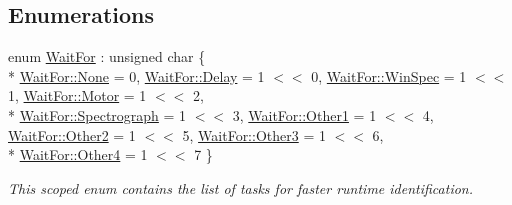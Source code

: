 \subsection*{Enumerations}
\begin{DoxyCompactItemize}
\item 
enum \hyperlink{namespace_wait_task_list_traits_a3cb74ee1929f03e51486087ef21caf9f}{Wait\+For} \+: unsigned char \{ \\*
\hyperlink{namespace_wait_task_list_traits_a3cb74ee1929f03e51486087ef21caf9fa6adf97f83acf6453d4a6a4b1070f3754}{Wait\+For\+::\+None} = 0, 
\hyperlink{namespace_wait_task_list_traits_a3cb74ee1929f03e51486087ef21caf9fa8f497c1a3d15af9e0c215019f26b887d}{Wait\+For\+::\+Delay} = 1 $<$$<$ 0, 
\hyperlink{namespace_wait_task_list_traits_a3cb74ee1929f03e51486087ef21caf9fa72be81983b1060a1c19315bfcc0fec96}{Wait\+For\+::\+Win\+Spec} = 1 $<$$<$ 1, 
\hyperlink{namespace_wait_task_list_traits_a3cb74ee1929f03e51486087ef21caf9fab33538179f5661a86cbe327a1793e199}{Wait\+For\+::\+Motor} = 1 $<$$<$ 2, 
\\*
\hyperlink{namespace_wait_task_list_traits_a3cb74ee1929f03e51486087ef21caf9fac7fc4af8d9e4c06e420a1396c67b2c05}{Wait\+For\+::\+Spectrograph} = 1 $<$$<$ 3, 
\hyperlink{namespace_wait_task_list_traits_a3cb74ee1929f03e51486087ef21caf9faed9aa33f81e5c861076f2b9a14cde0ce}{Wait\+For\+::\+Other1} = 1 $<$$<$ 4, 
\hyperlink{namespace_wait_task_list_traits_a3cb74ee1929f03e51486087ef21caf9fa73890f3ff21d36055971bc1837d1e378}{Wait\+For\+::\+Other2} = 1 $<$$<$ 5, 
\hyperlink{namespace_wait_task_list_traits_a3cb74ee1929f03e51486087ef21caf9fa9c5d1f216c477d66f934f6f2b626b472}{Wait\+For\+::\+Other3} = 1 $<$$<$ 6, 
\\*
\hyperlink{namespace_wait_task_list_traits_a3cb74ee1929f03e51486087ef21caf9fab5313789e3103b02c2c9a46d59e9c44e}{Wait\+For\+::\+Other4} = 1 $<$$<$ 7
 \}
\begin{DoxyCompactList}\small\item\em This scoped enum contains the list of tasks for faster runtime identification. \end{DoxyCompactList}\end{DoxyCompactItemize}
